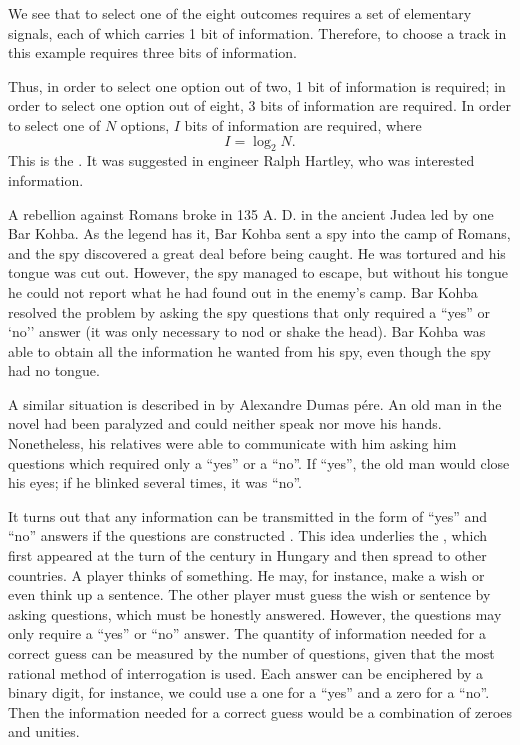 We see that to select one of the eight outcomes requires a set of
elementary signals, each of which carries 1 bit of information. Therefore,
to choose a track in this example requires three bits of information.

Thus, in order to select one option out of two, 1 bit of information is
required; in order to select one option out of eight, 3 bits of information
are required. In order to select one of $N$ options, $I$ bits of information
are required, where
\begin{equation}%
I = \log_{2} N.
\label{eq-3.1}
\end{equation}
This is the . It was suggested in engineer Ralph Hartley, who was interested information.

 A rebellion against Romans broke in 135 A. D.
in the ancient Judea led by one Bar Kohba. As the legend has it, Bar
Kohba sent a spy into the camp of Romans, and the spy discovered
a great deal before being caught. He was tortured and his tongue was
cut out. However, the spy managed to escape, but without his tongue he
could not report what he had found out in the enemy's camp. Bar
Kohba resolved the problem by asking the spy questions that only
required a ``yes'' or `no'' answer (it was only necessary to nod or shake
the head). Bar Kohba was able to obtain all the information he wanted
from his spy, even though the spy had no tongue.

A similar situation is described in  by
Alexandre Dumas p\'ere. An old man in the novel had been paralyzed
and could neither speak nor move his hands. Nonetheless, his relatives
were able to communicate with him asking him questions which
required only a ``yes'' or a ``no''. If ``yes'', the old man would close his
eyes; if he blinked several times, it was ``no''.


It turns out that any information can be transmitted in the form of
``yes'' and ``no'' answers if the questions are constructed . This idea underlies the , which first appeared at the turn of the century in Hungary and then spread to other countries. A player
thinks of something. He may, for instance, make a wish or even think
up a sentence. The other player must guess the wish or sentence by
asking questions, which must be honestly answered. However, the
questions may only require a ``yes'' or ``no'' answer. The quantity of
information needed for a correct guess can be measured by the number
of questions, given that the most rational method of interrogation is
used. Each answer can be enciphered by a binary digit, for instance, we
could use a one for a ``yes'' and a zero for a ``no''. Then the information
needed for a correct guess would be a combination of zeroes and unities.

